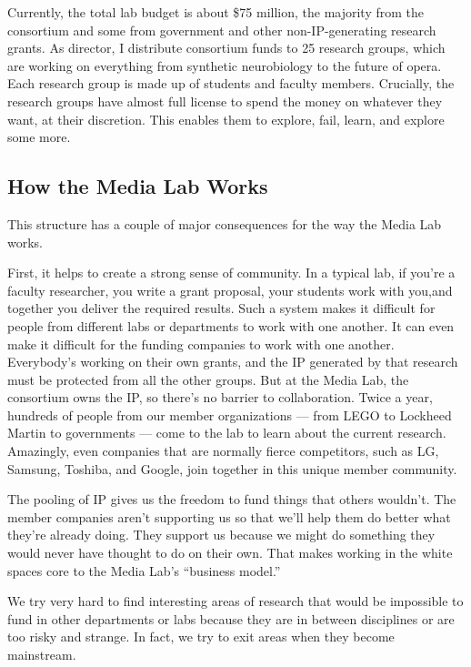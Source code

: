 Currently, the total lab budget is about \$75 million, the majority from the consortium and some from government and other non-IP-generating research grants. As director, I distribute consortium funds to 25 research groups, which are working on everything from synthetic neurobiology to the future of opera. Each research group is made up of students and faculty members. Crucially, the research groups have almost full license to spend the money on whatever they want, at their discretion. This enables them to explore, fail, learn, and explore some more.

\subsection{How the Media Lab Works}

This structure has a couple of major consequences for the way the Media Lab works. 

First, it helps to create a strong sense of community. In a typical lab, if you're a faculty researcher, you write a grant proposal, your students work with you,and together you deliver the required results. Such a system makes it difficult for people from different labs or departments to work with one another. It can even make it difficult for the funding companies to work with one another. Everybody's working on their own grants, and the IP generated by that research must be protected from all the other groups. But at the Media Lab, the consortium owns the IP, so there's no barrier to collaboration. Twice a year, hundreds of people from our member organizations --- from LEGO to Lockheed Martin to governments --- come to the lab to learn about the current research. Amazingly, even companies that are normally fierce competitors, such as LG, Samsung, Toshiba, and Google, join together in this unique member community.

The pooling of IP gives us the freedom to fund things that others wouldn't. The member companies aren't supporting us so that we'll help them do better what they're already doing. They support us because we might do something they would never have thought to do on their own. That makes working in the white spaces core to the Media Lab's ``business model.''

We try very hard to find interesting areas of research that would be impossible to fund in other departments or labs because they are in between disciplines or are too risky and strange. In fact, we try to exit areas when they become mainstream.

